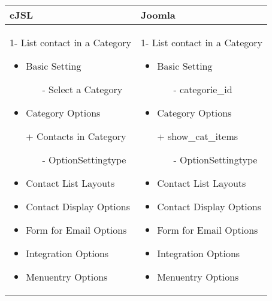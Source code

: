 \begin{minipage}{0.7\textwidth}
\begin{tabular}{|p{} | p{}|}
\hline
\textbf{cJSL} & \textbf{Joomla} \\ 
\hline
 1- List contact in a Category
   \begin{itemize}
     \item Basic  Setting 
    		\begin{enumerate}
    			\item[-] Select a Category
    		\end{enumerate}
    	\item Category Options
    	\item[+] Contacts in Category 
    		   \begin{enumerate}
    		    	 \item[-] OptionSettingtype
    		    \end{enumerate}
    \item Contact List Layouts
 	\item Contact Display Options
 	\item Form for Email Options
 	\item Integration Options
 	\item Menuentry Options
  \end{itemize}
 & 
1- List contact in a Category
  \begin{itemize}
    \item Basic  Setting 
   		\begin{enumerate}
   			\item[-] categorie\_id
   		\end{enumerate}
   	\item Category Options
   	\item[+] show\_cat\_items
   		    	  \begin{enumerate}
   		    			 \item[-] OptionSettingtype
   		    	\end{enumerate}
   	\item Contact List Layouts
	\item Contact Display Options
	\item Form for Email Options
	\item Integration Options
	\item Menuentry Options
 \end{itemize}
\\
\hline
\end{tabular}
\end{minipage}

